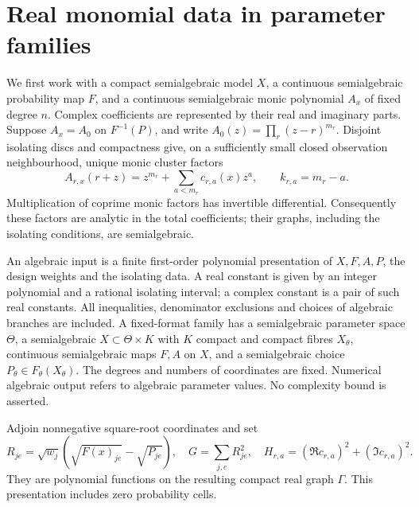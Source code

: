 \section{Real monomial data in parameter families}\label{sec:real}
We first work with a compact semialgebraic model $X$, a continuous
semialgebraic probability map $F$, and a continuous semialgebraic monic
polynomial $A_x$ of fixed degree $n$. Complex coefficients are represented
by their real and imaginary parts. Suppose $A_x=A_0$ on $F^{-1}(P)$,
and write $A_0(z)=\prod_r(z-r)^{m_r}$. Disjoint isolating discs and
compactness give, on a sufficiently small closed observation neighbourhood,
unique monic cluster factors
\begin{equation}\label{eq:clusters}
 A_{r,x}(r+z)=z^{m_r}+\sum_{a<m_r}c_{r,a}(x)z^a,
 \qquad k_{r,a}=m_r-a.
\end{equation}
Multiplication of coprime monic factors has invertible differential.
Consequently these factors are analytic in the total coefficients; their
graphs, including the isolating conditions, are semialgebraic.

\begin{definition}\label{def:input}
An algebraic input is a finite first-order polynomial presentation of
$X,F,A,P$, the design weights and the isolating data. A real constant
is given by an integer polynomial and a rational isolating interval;
a complex constant is a pair of such real constants. All inequalities,
denominator exclusions and choices of algebraic branches are included.
A fixed-format family has a semialgebraic parameter space $\Theta$,
a semialgebraic $X\subset\Theta\times K$ with $K$ compact and compact
fibres $X_\theta$, continuous semialgebraic maps $F,A$ on $X$, and a
semialgebraic choice $P_\theta\in F_\theta(X_\theta)$. The degrees and
numbers of coordinates are fixed. Numerical algebraic output refers
to algebraic parameter values. No complexity bound is asserted.
\end{definition}

Adjoin nonnegative square-root coordinates and set
\[
 R_{je}=\sqrt{w_j}(\sqrt{F(x)_{je}}-\sqrt{P_{je}}),\quad
 G=\sum_{j,e}R_{je}^2,\quad
 H_{r,a}=(\Re c_{r,a})^2+(\Im c_{r,a})^2.
\]
They are polynomial functions on the resulting compact real graph
$\Gamma$. This presentation includes zero probability cells.

